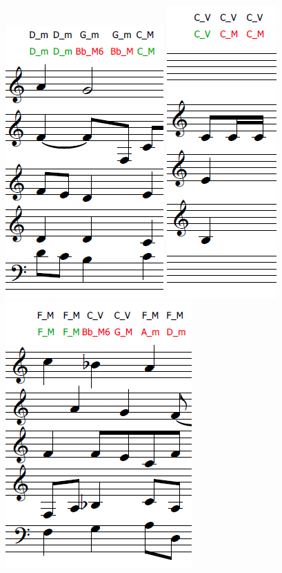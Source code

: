 \documentclass{article} %
\begin{document}
\includegraphics[scale=0.5]{relative_error.PNG}
\includegraphics[scale=0.5]{VM_error.PNG}
\includegraphics[scale=0.5]{other_error.PNG}
\end{document}
